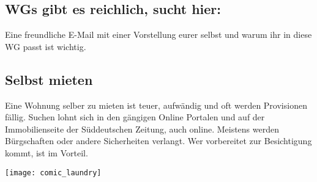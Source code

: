\raggedcolumns
\begin{multicols}{2}

\subsection*{WGs gibt es reichlich, sucht hier:}
Eine freundliche E-Mail mit einer Vorstellung eurer selbst und warum ihr
in diese WG passt ist wichtig.

\begin{urlList}
\end{urlList}

\subsection*{Selbst mieten} 
Eine Wohnung selber zu mieten ist teuer, aufwändig und oft werden Provisionen fällig. Suchen
lohnt sich in den gängigen Online Portalen und auf der Immobilienseite der
Süddeutschen Zeitung, auch online. Meistens werden Bürgschaften oder andere
Sicherheiten verlangt.  Wer vorbereitet zur Besichtigung kommt, ist im Vorteil.

\columnbreak
\begin{center}
	\texttt{[image: comic\_laundry]}
\end{center}

\end{multicols}

